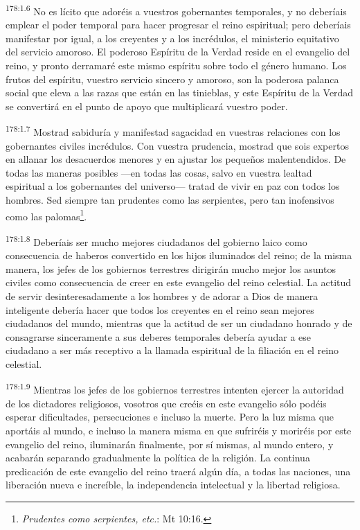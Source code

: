 \par
\textsuperscript{178:1.6} No es lícito que adoréis a vuestros gobernantes temporales, y no deberíais emplear el poder temporal para hacer progresar el reino espiritual; pero deberíais manifestar por igual, a los creyentes y a los incrédulos, el ministerio equitativo del servicio amoroso. El poderoso Espíritu de la Verdad reside en el evangelio del reino, y pronto derramaré este mismo espíritu sobre todo el género humano. Los frutos del espíritu, vuestro servicio sincero y amoroso, son la poderosa palanca social que eleva a las razas que están en las tinieblas, y este Espíritu de la Verdad se convertirá en el punto de apoyo que multiplicará vuestro poder.

\par
\textsuperscript{178:1.7} Mostrad sabiduría y manifestad sagacidad en vuestras relaciones con los gobernantes civiles incrédulos. Con vuestra prudencia, mostrad que sois expertos en allanar los desacuerdos menores y en ajustar los pequeños malentendidos. De todas las maneras posibles ---en todas las cosas, salvo en vuestra lealtad espiritual a los gobernantes del universo--- tratad de vivir en paz con todos los hombres. Sed siempre tan prudentes como las serpientes, pero tan inofensivos como las palomas\footnote{\textit{Prudentes como serpientes, etc.}: Mt 10:16.}.

\par
\textsuperscript{178:1.8} Deberíais ser mucho mejores ciudadanos del gobierno laico como consecuencia de haberos convertido en los hijos iluminados del reino; de la misma manera, los jefes de los gobiernos terrestres dirigirán mucho mejor los asuntos civiles como consecuencia de creer en este evangelio del reino celestial. La actitud de servir desinteresadamente a los hombres y de adorar a Dios de manera inteligente debería hacer que todos los creyentes en el reino sean mejores ciudadanos del mundo, mientras que la actitud de ser un ciudadano honrado y de consagrarse sinceramente a sus deberes temporales debería ayudar a ese ciudadano a ser más receptivo a la llamada espiritual de la filiación en el reino celestial.

\par
\textsuperscript{178:1.9} Mientras los jefes de los gobiernos terrestres intenten ejercer la autoridad de los dictadores religiosos, vosotros que creéis en este evangelio sólo podéis esperar dificultades, persecuciones e incluso la muerte. Pero la luz misma que aportáis al mundo, e incluso la manera misma en que sufriréis y moriréis por este evangelio del reino, iluminarán finalmente, por sí mismas, al mundo entero, y acabarán separando gradualmente la política de la religión. La continua predicación de este evangelio del reino traerá algún día, a todas las naciones, una liberación nueva e increíble, la independencia intelectual y la libertad religiosa.

